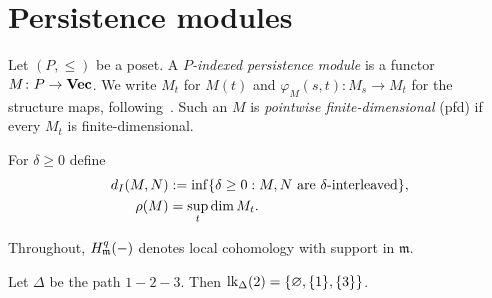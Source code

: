 \section{Persistence modules}\label{sec:modules}

\begin{definition}\label{def:pm}
Let $(P,\le)$ be a poset. A \emph{$P$-indexed persistence module} is a functor $M\colon P\to\Vec$.
We write $M_t$ for $M(t)$ and $\varphi_M(s,t)\colon M_s\to M_t$ for the structure maps, following~\cite[Definition~2.1]{chazal2016structure}.
Such an $M$ is \emph{pointwise finite-dimensional} \textup{(}pfd\textup{)} if every $M_t$ is finite-dimensional.
\end{definition}

\begin{definition}\label{def:interleave}
For $\delta\ge 0$ define
\begin{align}
d_I(M,N) &:= \inf\{\delta\ge0: M,N \text{ are } \delta\text{-interleaved}\},\label{eq:di}\\
\rho(M) &= \sup_t \dim M_t. \notag
\end{align}
\end{definition}

\begin{convention}
Throughout, $\Hloc{q}{\mathfrak m}(-)$ denotes local cohomology with support in $\mathfrak m$.
\end{convention}

\begin{example}
Let $\Delta$ be the path $1-2-3$. Then $\link_\Delta(2)=\{\varnothing,\{1\},\{3\}\}$.
\end{example}
